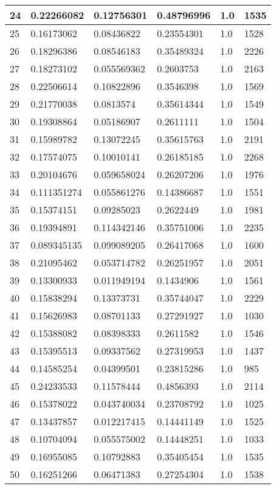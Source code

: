 \begin{longtable}{|l|l|l|l|l|l|}
24 & 0.22266082 & 0.12756301 & 0.48796996 & 1.0 & 1535 \\ \hline 
25 & 0.16173062 & 0.08436822 & 0.23554301 & 1.0 & 1528 \\ \hline 
26 & 0.18296386 & 0.08546183 & 0.35489324 & 1.0 & 2226 \\ \hline 
27 & 0.18273102 & 0.055569362 & 0.2603753 & 1.0 & 2163 \\ \hline 
28 & 0.22506614 & 0.10822896 & 0.3546398 & 1.0 & 1569 \\ \hline 
29 & 0.21770038 & 0.0813574 & 0.35614344 & 1.0 & 1549 \\ \hline 
30 & 0.19308864 & 0.05186907 & 0.2611111 & 1.0 & 1504 \\ \hline 
31 & 0.15989782 & 0.13072245 & 0.35615763 & 1.0 & 2191 \\ \hline 
32 & 0.17574075 & 0.10010141 & 0.26185185 & 1.0 & 2268 \\ \hline 
33 & 0.20104676 & 0.059658024 & 0.26207206 & 1.0 & 1976 \\ \hline 
34 & 0.111351274 & 0.055861276 & 0.14386687 & 1.0 & 1551 \\ \hline 
35 & 0.15374151 & 0.09285023 & 0.2622449 & 1.0 & 1981 \\ \hline 
36 & 0.19394891 & 0.114342146 & 0.35751006 & 1.0 & 2235 \\ \hline 
37 & 0.089345135 & 0.099089205 & 0.26417068 & 1.0 & 1600 \\ \hline 
38 & 0.21095462 & 0.053714782 & 0.26251957 & 1.0 & 2051 \\ \hline 
39 & 0.13300933 & 0.011949194 & 0.1434906 & 1.0 & 1561 \\ \hline 
40 & 0.15838294 & 0.13373731 & 0.35744047 & 1.0 & 2229 \\ \hline 
41 & 0.15626983 & 0.08701133 & 0.27291927 & 1.0 & 1030 \\ \hline 
42 & 0.15388082 & 0.08398333 & 0.2611582 & 1.0 & 1546 \\ \hline 
43 & 0.15395513 & 0.09337562 & 0.27319953 & 1.0 & 1437 \\ \hline 
44 & 0.14585254 & 0.04399501 & 0.23815286 & 1.0 & 985 \\ \hline 
45 & 0.24233533 & 0.11578444 & 0.4856393 & 1.0 & 2114 \\ \hline 
46 & 0.15378022 & 0.043740034 & 0.23708792 & 1.0 & 1025 \\ \hline 
47 & 0.13437857 & 0.012217415 & 0.14441149 & 1.0 & 1525 \\ \hline 
48 & 0.10704094 & 0.055575002 & 0.14448251 & 1.0 & 1033 \\ \hline 
49 & 0.16955085 & 0.10792883 & 0.35405454 & 1.0 & 1535 \\ \hline 
50 & 0.16251266 & 0.06471383 & 0.27254304 & 1.0 & 1538 \\ \hline 
\end{longtable}